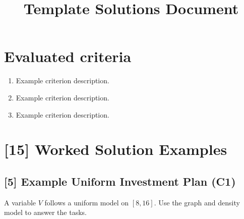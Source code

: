 \makeatletter
{}
\makeatother






\title{Template Solutions Document}
\author{}
\date{}


\maketitle

\setcounter{tocdepth}{1}
\setcounter{secnumdepth}{2}
\label{toc}
\tableofcontents

\section*{Evaluated criteria}
\begin{enumerate}[label=\textbf{C\arabic*.}]
    \item Example criterion description.
    \item Example criterion description.
    \item Example criterion description.
\end{enumerate}

\section{[15] Worked Solution Examples}
\label{sec:worked-solution-examples}


\subsection{[5] Example Uniform Investment Plan (C1)}
\label{sec:example-uniform-investment-plan-c1}
A variable $V$ follows a uniform model on $[8,16]$. Use the graph and density model to answer the tasks.


